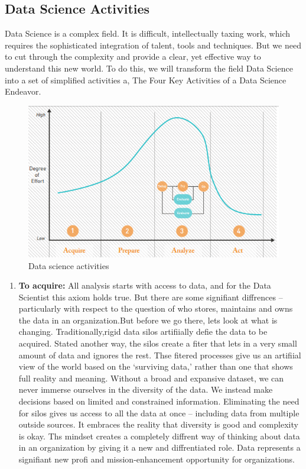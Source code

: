 \documentclass[a4paper,12pt,oneside]{report}
\begin{document}
\subsection{Data Science Activities }
{Data Science is a complex field. It is difficult, intellectually taxing work, which requires the sophisticated integration of talent, tools and techniques. But we need to cut through the complexity and provide a clear, yet effective way to understand this new world. To do this, we will transform the field Data Science into a set of simplified activities a, The Four Key Activities of a Data Science Endeavor.
\begin{figure}[ht]
\centering
\includegraphics[width=1\textwidth]{"Data science activities"}
\caption{Data science activities}
\end{figure}
\begin{enumerate}
\item \textbf {To acquire:} {All analysis starts with access to data, and for the Data Scientist this axiom holds true. But there are some signifiant diffrences –particularly with respect to the question of who stores, maintains and
owns the data in an organization.But before we go there, lets look at what is changing. Traditionally,rigid data silos artifiially defie the data to be acquired. Stated another way, the silos create a fiter that lets in a very small amount of
data and ignores the rest. Thse fitered processes give us an artifiial view of the world based on the ‘surviving data,’ rather than one that shows full reality and meaning. Without a broad and expansive dataset, we can never immerse ourselves in the diversity of the
data. We instead make decisions based on limited and constrained information. Eliminating the need for silos gives us access to all the data at once – including data from multiple outside sources. It embraces the reality that diversity is good and complexity is okay. Ths mindset creates a completely diffrent way of thinking about data in an organization by giving it a new and diffrentiated role. Data represents a signifiant new profi and mission-enhancement opportunity for organizations.\\
}
\end{enumerate}}
\end{document}
